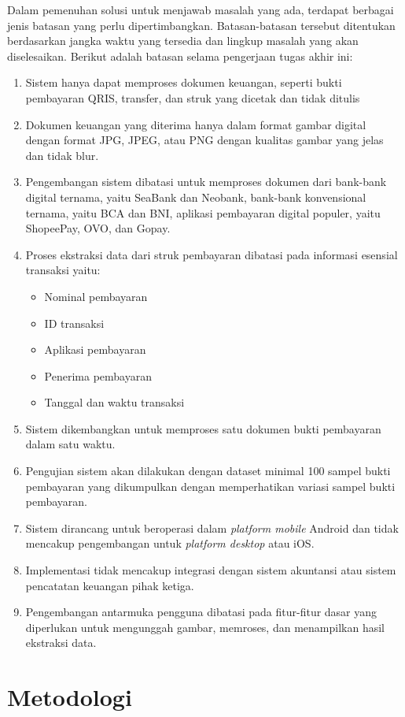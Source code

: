 Dalam pemenuhan solusi untuk menjawab masalah yang ada, terdapat berbagai jenis batasan yang perlu dipertimbangkan. Batasan-batasan tersebut ditentukan berdasarkan jangka waktu yang tersedia dan lingkup masalah yang akan diselesaikan. Berikut adalah batasan selama pengerjaan tugas akhir ini:
\begin{enumerate}
	\item Sistem hanya dapat memproses dokumen keuangan, seperti bukti pembayaran QRIS, transfer, dan struk yang dicetak dan tidak ditulis 
	\item Dokumen keuangan yang diterima hanya dalam format gambar digital dengan format JPG, JPEG, atau PNG dengan kualitas gambar yang jelas dan tidak blur. 
	\item  Pengembangan sistem dibatasi untuk memproses dokumen dari bank-bank digital ternama, yaitu SeaBank dan Neobank, bank-bank konvensional ternama, yaitu BCA dan BNI, aplikasi pembayaran digital populer, yaitu ShopeePay, OVO, dan Gopay.
	\item  Proses ekstraksi data dari struk pembayaran dibatasi pada informasi esensial transaksi yaitu:  
	\begin{itemize}
		\item Nominal pembayaran 
		\item ID transaksi 
		\item Aplikasi pembayaran 
		\item Penerima pembayaran
		\item Tanggal dan waktu transaksi 
	\end{itemize}
	\item Sistem dikembangkan untuk memproses satu dokumen bukti pembayaran dalam satu waktu.
	\item Pengujian sistem akan dilakukan dengan dataset minimal 100 sampel bukti pembayaran yang dikumpulkan dengan memperhatikan variasi sampel bukti pembayaran.
	\item Sistem dirancang untuk beroperasi dalam \emph{platform mobile} Android dan tidak mencakup pengembangan untuk \emph{platform desktop} atau iOS.
	\item Implementasi tidak mencakup integrasi dengan sistem akuntansi atau sistem pencatatan keuangan pihak ketiga.
	\item Pengembangan antarmuka pengguna dibatasi pada fitur-fitur dasar yang diperlukan untuk mengunggah gambar, memroses, dan menampilkan hasil ekstraksi data.
\end{enumerate}

\section{Metodologi}

